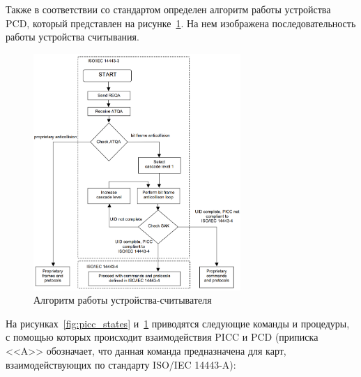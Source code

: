 Также в соответствии со стандартом определен алгоритм работы устройства PCD, который представлен на рисунке~\ref{fig:pcd_flow}.
На нем изображена последовательность работы устройства считывания.

\begin{figure}[H]
    \centering
    \includegraphics[width=0.7\textwidth]{images/research/pcd_flow}
    \caption{\centering Алгоритм работы устройства-считывателя}
    \label{fig:pcd_flow}
\end{figure}


На рисунках~\ref{fig:picc_states} и~\ref{fig:pcd_flow} приводятся следующие команды и процедуры, с помощью которых происходит взаимодействия PICC и PCD (приписка <<A>> обозначает, что данная команда предназначена для карт, взаимодействующих по стандарту ISO/IEC 14443-A):

